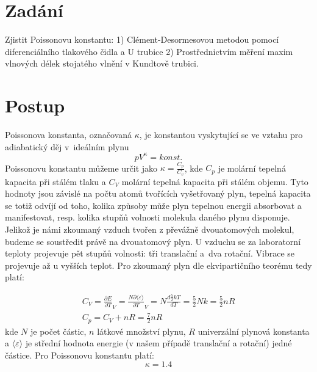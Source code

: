 \documentclass[czech,11pt,a4paper]{article}
\begin{document}
	
	\section{Zadání}
	Zjistit Poissonovu konstantu:
	1) Clément-Desormesovou metodou pomocí diferenciálního tlakového čidla a U trubice
	2) Prostřednictvím měření maxim vlnových délek stojatého vlnění v Kundtově trubici.
	
	\section{Postup}
	Poissonova konstanta, označovaná $\kappa$, je konstantou vyskytující se ve vztahu pro adiabatický děj
	v~ideálním plynu
	\begin{equation}
		pV^{\kappa} = konst.
	\end{equation}
	Poissonovu konstantu můžeme určit jako $\kappa = \frac{C_p}{C_v} $, kde $C_p$ je molární tepelná kapacita při stálém tlaku a $C_V$ molární tepelná kapacita při stálém objemu. Tyto hodnoty jsou závislé na počtu atomů tvořících vyšetřovaný plyn, tepelná kapacita se totiž odvíjí od toho, kolika způsoby může plyn tepelnou energii absorbovat a manifestovat, resp. kolika stupňů volnosti molekula daného plynu disponuje. Jelikož je námi zkoumaný vzduch tvořen z převážně dvouatomových molekul, budeme se soustředit právě na dvouatomový plyn. U vzduchu se za laboratorní teploty projevuje pět stupňů volnosti: tři translační a~dva rotační. Vibrace se projevuje až u vyšších teplot. Pro zkoumaný plyn dle ekvipartičního teorému tedy platí:

	\begin{gather}
			C_V = \frac {\partial E}{\partial T}_V = \frac{N \partial \langle \varepsilon \rangle}{\partial T}_V = N \frac{d \frac{5}{2}kT}{dT} = \frac 5 2 Nk = \frac 5 2 nR \\
		C_p = C_V + nR = \frac 7 2 nR
		\end{gather}
		kde $N$ je počet částic, $n$ látkové množství plynu, $R$ univerzální plynová konstanta a $\langle \varepsilon \rangle $ je střední hodnota energie (v našem případě translační a rotační) jedné částice.
		Pro Poissonovu konstantu platí:
		\begin{equation}
			\kappa = 1.4
		\end{equation}
		
\end{document}
